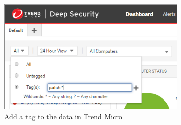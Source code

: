 \begin{figure}[htbp]
      \centering
      \includegraphics[width=0.8\textwidth]{Figures/Trend Micro/path.png}
      \caption{Add a tag to the data in Trend Micro}
\end{figure}



